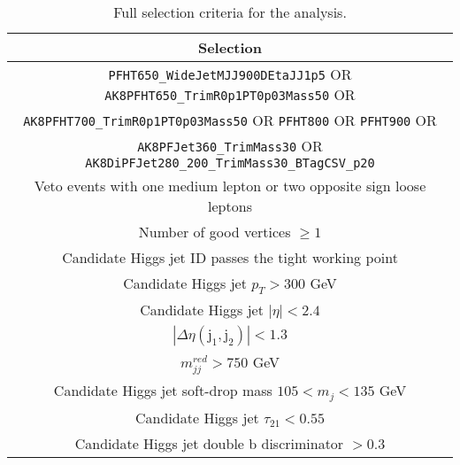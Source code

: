 

\begin{table}[h!]
\begin{center}
    \begin{tabular}{c}
    \hline
    \hline
    Selection \\
    \hline
    \texttt{PFHT650\_WideJetMJJ900DEtaJJ1p5} OR \texttt{AK8PFHT650\_TrimR0p1PT0p03Mass50} OR \\
    \texttt{AK8PFHT700\_TrimR0p1PT0p03Mass50} OR \texttt{PFHT800} OR \texttt{PFHT900} OR \\
    \texttt{AK8PFJet360\_TrimMass30} OR \texttt{AK8DiPFJet280\_200\_TrimMass30\_BTagCSV\_p20}\\
    Veto events with one medium lepton or two opposite sign loose leptons\\
    Number of good vertices $\geq 1$ \\
    Candidate Higgs jet ID passes the tight working point \\
    Candidate Higgs jet $p_{T}>300$ GeV \\
    Candidate Higgs jet $\left|\eta\right|<2.4$ \\
    $|\Delta\eta(\mathrm{j}_{1}, \mathrm{j}_{2})|<1.3$ \\
    $m_{jj}^{red}>750$ GeV \\
    Candidate Higgs jet soft-drop mass $105 < m_j <135$ GeV \\
    Candidate Higgs jet $\tau_{21}<0.55$ \\
    Candidate Higgs jet double b discriminator $> 0.3$ \\
    \hline
    \hline
    \end{tabular}
    \caption{Full selection criteria for the analysis.} \label{tab:datamcselection}
\end{center}
\end{table}

